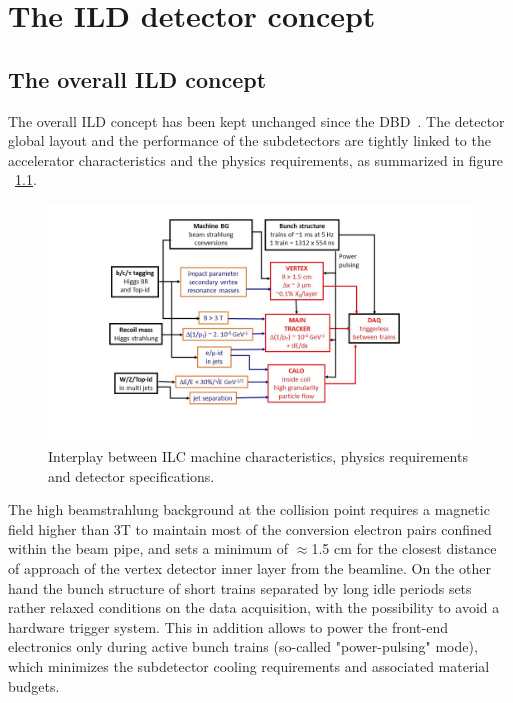 \chapter{The ILD detector concept}


\section{The overall ILD concept}

The overall ILD concept has been kept unchanged since the DBD~\cite{ild:bib:ILDDBD}. The detector global layout and the performance of the subdetectors are tightly linked to the accelerator characteristics and the physics requirements, as summarized in figure ~\ref{fig:ILD:specifications}. 

\begin{figure}[t!]
\centering
\includegraphics[width=1.2\hsize]{ILD/fig/ILD_specifications.jpg}
\caption{Interplay between ILC machine characteristics, physics requirements and detector specifications.}
\label{fig:ILD:specifications}
\end{figure}
	
The high beamstrahlung background at the collision point requires a magnetic field higher than 3T to maintain most of the conversion electron pairs confined within the beam pipe, and sets a minimum of $\approx$1.5 cm for the closest distance of approach of the vertex detector inner layer from the beamline. On the other hand the bunch structure of short trains separated by long idle periods sets rather relaxed conditions on the data acquisition, with the possibility to avoid a hardware trigger system. This in addition allows to power the front-end electronics only during active bunch trains (so-called "power-pulsing" mode), which minimizes the subdetector cooling requirements and associated material budgets.  

